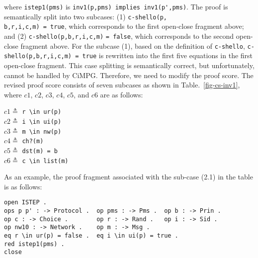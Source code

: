 \documentclass[a4paper,fleqn]{cas-dc}
\begin{document}
\noindent
where \verb!istep1(pms)! is \verb!inv1(p,pms) implies inv1(p',pms)!.
The proof is semantically split into two subcases: (1)  \verb!c-shello(p,!\\\verb!b,r,i,c,m) = true!, which corresponds to the first open-close fragment above; 
and (2) \verb!c-shello(p,b,r,i,c,m)! \verb!= false!,
which corresponds to the second open-close fragment above. 
For the subcase (1), based on the definition of \verb!c-shello!,  \verb!c-shello(p,b,r,i,c,m) = true! is rewritten into the first five equations in the first open-close fragment. 
This case splitting is semantically correct, but unfortunately, cannot be handled by CiMPG. 
Therefore, we need to modify the proof score. 
The revised proof score consists of seven subcases as shown in Table.~\ref{fig-cs-inv1}, where $c1$, $c2$, $c3$, $c4$, $c5$, and $c6$ are as follows:

\medskip

\noindent
$c1 \triangleq$ \verb!r \in ur(p)!\\
$c2 \triangleq$ \verb!i \in ui(p)!\\
$c3 \triangleq$ \verb!m \in nw(p)!\\
$c4 \triangleq$ \verb!ch?(m)!\\
$c5 \triangleq$ \verb!dst(m) = b!\\
$c6 \triangleq$ \verb!c \in list(m)!

\medskip

As an example, the proof fragment associated with the sub-case (2.1) in the table is as follows:

 \begin{small}
	\begin{verbatim}
open ISTEP .
ops p p' : -> Protocol .  op pms : -> Pms .  op b : -> Prin .
op c : -> Choice .        op r : -> Rand .   op i : -> Sid . 
op nw10 : -> Network .    op m : -> Msg .           
eq r \in ur(p) = false .  eq i \in ui(p) = true .
red istep1(pms) .
close
	\end{verbatim}
\end{small}
\end{document}
